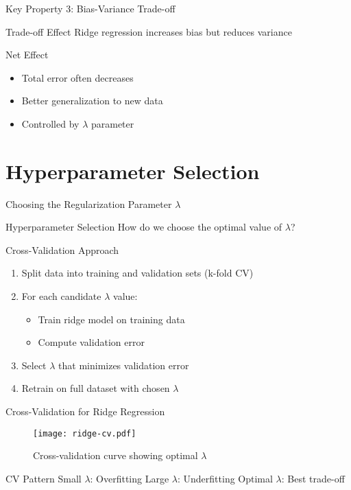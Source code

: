 \documentclass{beamer}
\begin{document}
\begin{frame}{Key Property 3: Bias-Variance Trade-off}
\begin{theorembox}{Trade-off Effect}
Ridge regression increases bias but reduces variance
\end{theorembox}
\pause

\begin{keypointsbox}{Net Effect}
\begin{itemize}
\item Total error often decreases
\item Better generalization to new data
\item Controlled by $\lambda$ parameter
\end{itemize}
\end{keypointsbox}
\end{frame}

\section{Hyperparameter Selection}

\begin{frame}{Choosing the Regularization Parameter $\lambda$}
\begin{alertbox}{Hyperparameter Selection}
How do we choose the optimal value of $\lambda$?
\end{alertbox}
\pause

\begin{theorembox}{Cross-Validation Approach}
\begin{enumerate}
\item Split data into training and validation sets (k-fold CV)
\item For each candidate $\lambda$ value:
   \begin{itemize}
   \item Train ridge model on training data
   \item Compute validation error
   \end{itemize}
\item Select $\lambda$ that minimizes validation error
\item Retrain on full dataset with chosen $\lambda$
\end{enumerate}
\end{theorembox}
\end{frame}

\begin{frame}{Cross-Validation for Ridge Regression}
\begin{figure}
\centering
\texttt{[image: ridge-cv.pdf]}
\caption{{\small Cross-validation curve showing optimal $\lambda$}}
\end{figure}

\vspace{-0.1cm}
\begin{keypointsbox}{CV Pattern}
{\footnotesize 
Small $\lambda$: Overfitting \quad Large $\lambda$: Underfitting \quad Optimal $\lambda$: Best trade-off
}
\end{keypointsbox}
\end{frame}
\end{document}
